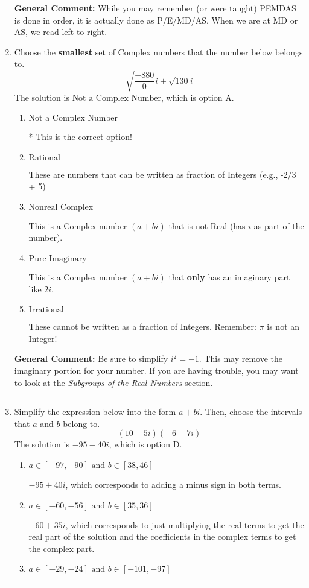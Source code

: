 \documentclass{extbook}[14pt]
\newcommand{\litem}[1]{\item #1

\rule{\textwidth}{0.4pt}}
\begin{document}
\begin{enumerate}
{\textbf{General Comment:} While you may remember (or were taught) PEMDAS is done in order, it is actually done as P/E/MD/AS. When we are at MD or AS, we read left to right.
}
\litem{
Choose the \textbf{smallest} set of Complex numbers that the number below belongs to.
\[ \sqrt{\frac{-880}{0}} i+\sqrt{130}i \]
The solution is \( \text{Not a Complex Number} \), which is option A.\begin{enumerate}[label=\Alph*.]
\item \( \text{Not a Complex Number} \)

* This is the correct option!
\item \( \text{Rational} \)

These are numbers that can be written as fraction of Integers (e.g., -2/3 + 5)
\item \( \text{Nonreal Complex} \)

This is a Complex number $(a+bi)$ that is not Real (has $i$ as part of the number).
\item \( \text{Pure Imaginary} \)

This is a Complex number $(a+bi)$ that \textbf{only} has an imaginary part like $2i$.
\item \( \text{Irrational} \)

These cannot be written as a fraction of Integers. Remember: $\pi$ is not an Integer!
\end{enumerate}

\textbf{General Comment:} Be sure to simplify $i^2 = -1$. This may remove the imaginary portion for your number. If you are having trouble, you may want to look at the \textit{Subgroups of the Real Numbers} section.
}
\litem{
Simplify the expression below into the form $a+bi$. Then, choose the intervals that $a$ and $b$ belong to.
\[ (10 - 5 i)(-6 - 7 i) \]
The solution is \( -95 - 40 i \), which is option D.\begin{enumerate}[label=\Alph*.]
\item \( a \in [-97, -90] \text{ and } b \in [38, 46] \)

 $-95 + 40 i$, which corresponds to adding a minus sign in both terms.
\item \( a \in [-60, -56] \text{ and } b \in [35, 36] \)

 $-60 + 35 i$, which corresponds to just multiplying the real terms to get the real part of the solution and the coefficients in the complex terms to get the complex part.
\item \( a \in [-29, -24] \text{ and } b \in [-101, -97] \)


\end{enumerate}}
\end{enumerate}
\end{document}
